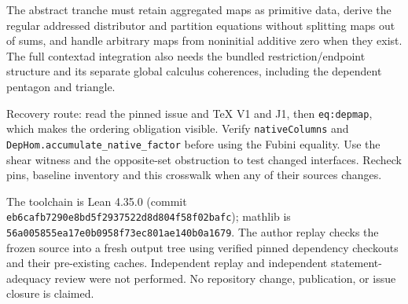 \documentclass[11pt]{article}
\begin{document}
The abstract tranche must retain aggregated maps as primitive data,
derive the regular addressed distributor and partition equations without
splitting maps out of sums, and handle arbitrary maps from noninitial
additive zero when they exist. The full contextad integration also needs the
bundled restriction/endpoint structure and its separate global calculus
coherences, including the dependent pentagon and triangle.

Recovery route: read the pinned issue and TeX V1 and J1, then
\texttt{eq:depmap}, which makes the ordering obligation visible. Verify
\verb|nativeColumns| and \verb|DepHom.accumulate_native_factor| before
using the Fubini equality. Use the shear witness and the opposite-set
obstruction to test changed interfaces. Recheck pins, baseline inventory
and this crosswalk when any of their sources changes.

The toolchain is Lean 4.35.0 (commit
\texttt{eb6cafb7290e8bd5f2937522d8d804f58f02bafc}); mathlib is
\texttt{56a005855ea17e0b0958f73ec801ae140b0a1679}. The author replay checks
the frozen source into a fresh output tree using verified pinned dependency
checkouts and their pre-existing caches. Independent replay and independent
statement-adequacy review were not performed. No repository change,
publication, or issue closure is claimed.
\end{document}
